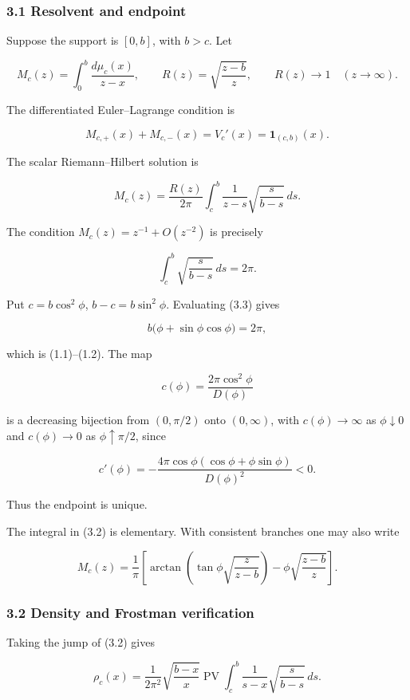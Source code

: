 \subsubsection{3.1 Resolvent and endpoint}

Suppose the support is \([0,b]\), with \(b>c\). Let

\[
M_c(z)=\int_0^b\frac{d\mu_c(x)}{z-x},
\qquad
R(z)=\sqrt{\frac{z-b}{z}},\qquad R(z)\to1\quad(z\to\infty).
\]

The differentiated Euler--Lagrange condition is

\[
M_{c,+}(x)+M_{c,-}(x)=V_c'(x)
=\mathbf1_{(c,b)}(x). \tag{DS-3.1}
\]

The scalar Riemann--Hilbert solution is

\[
M_c(z)=\frac{R(z)}{2\pi}
\int_c^b\frac{1}{z-s}\sqrt{\frac{s}{b-s}}\,ds. \tag{DS-3.2}
\]

The condition \(M_c(z)=z^{-1}+O(z^{-2})\) is precisely

\[
\int_c^b\sqrt{\frac{s}{b-s}}\,ds=2\pi. \tag{DS-3.3}
\]

Put \(c=b\cos^2\phi\), \(b-c=b\sin^2\phi\). Evaluating (3.3) gives

\[
b\bigl(\phi+\sin\phi\cos\phi\bigr)=2\pi,
\]

which is (1.1)--(1.2). The map

\[
c(\phi)=\frac{2\pi\cos^2\phi}{D(\phi)}
\]

is a decreasing bijection from \((0,\pi/2)\) onto \((0,\infty)\), with
\(c(\phi)\to\infty\) as \(\phi\downarrow0\) and \(c(\phi)\to0\) as
\(\phi\uparrow\pi/2\), since

\[
c'(\phi)
=-\frac{4\pi\cos\phi(\cos\phi+\phi\sin\phi)}{D(\phi)^2}<0. \tag{DS-3.4}
\]

Thus the endpoint is unique.

The integral in (3.2) is elementary. With consistent branches one may also
write

\[
\boxed{
M_c(z)=\frac1\pi\left[
\arctan\left(\tan\phi\sqrt{\frac{z}{z-b}}\right)
-\phi\sqrt{\frac{z-b}{z}}
\right].} \tag{DS-3.5}
\]

\subsubsection{3.2 Density and Frostman verification}

Taking the jump of (3.2) gives

\[
\rho_c(x)=\frac1{2\pi^2}\sqrt{\frac{b-x}{x}}
\operatorname{PV}\!\int_c^b
\frac1{s-x}\sqrt{\frac{s}{b-s}}\,ds. \tag{DS-3.6}
\]

